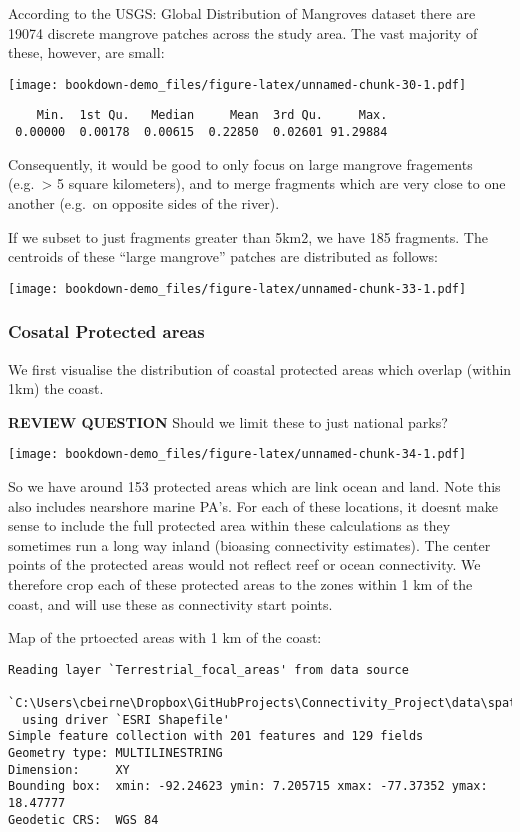 \documentclass[
]{book}
\begin{document}
According to the USGS: Global Distribution of Mangroves dataset there are 19074 discrete mangrove patches across the study area. The vast majority of these, however, are small:

\texttt{[image: bookdown-demo\_files/figure-latex/unnamed-chunk-30-1.pdf]}

\begin{verbatim}
    Min.  1st Qu.   Median     Mean  3rd Qu.     Max. 
 0.00000  0.00178  0.00615  0.22850  0.02601 91.29884 
\end{verbatim}

Consequently, it would be good to only focus on large mangrove fragements (e.g.~\textgreater{} 5 square kilometers), and to merge fragments which are very close to one another (e.g.~on opposite sides of the river).

If we subset to just fragments greater than 5km2, we have 185 fragments. The centroids of these ``large mangrove'' patches are distributed as follows:

\texttt{[image: bookdown-demo\_files/figure-latex/unnamed-chunk-33-1.pdf]}

\hypertarget{cosatal-protected-areas}{%
\subsubsection{Cosatal Protected areas}\label{cosatal-protected-areas}}

We first visualise the distribution of coastal protected areas which overlap (within 1km) the coast.

\textbf{REVIEW QUESTION} Should we limit these to just national parks?

\texttt{[image: bookdown-demo\_files/figure-latex/unnamed-chunk-34-1.pdf]}

So we have around 153 protected areas which are link ocean and land. Note this also includes nearshore marine PA's. For each of these locations, it doesnt make sense to include the full protected area within these calculations as they sometimes run a long way inland (bioasing connectivity estimates). The center points of the protected areas would not reflect reef or ocean connectivity. We therefore crop each of these protected areas to the zones within 1 km of the coast, and will use these as connectivity start points.

Map of the prtoected areas with 1 km of the coast:

\begin{verbatim}
Reading layer `Terrestrial_focal_areas' from data source 
  `C:\Users\cbeirne\Dropbox\GitHubProjects\Connectivity_Project\data\spatial\protected_areas\Terrestrial_focal_areas.shp' 
  using driver `ESRI Shapefile'
Simple feature collection with 201 features and 129 fields
Geometry type: MULTILINESTRING
Dimension:     XY
Bounding box:  xmin: -92.24623 ymin: 7.205715 xmax: -77.37352 ymax: 18.47777
Geodetic CRS:  WGS 84
\end{verbatim}
\end{document}
